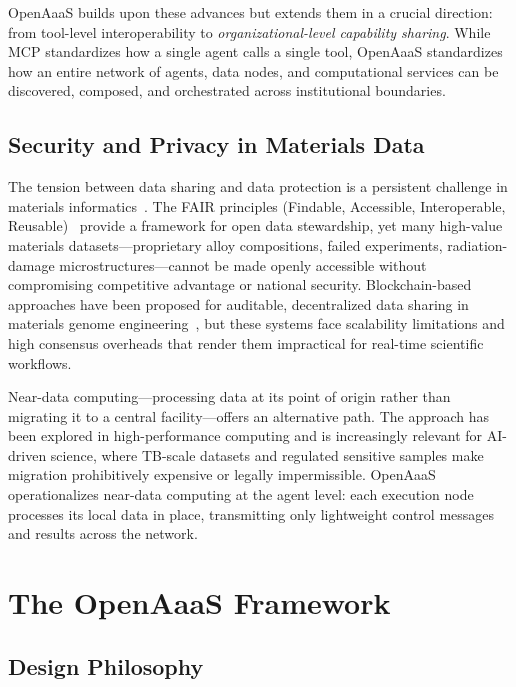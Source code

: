 \documentclass{article}
\begin{document}
OpenAaaS builds upon these advances but extends them in a crucial direction: from tool-level interoperability to \textit{organizational-level capability sharing}. While MCP standardizes how a single agent calls a single tool, OpenAaaS standardizes how an entire network of agents, data nodes, and computational services can be discovered, composed, and orchestrated across institutional boundaries.

\subsection{Security and Privacy in Materials Data}

The tension between data sharing and data protection is a persistent challenge in materials informatics~\cite{wilkinson2016,sears2024}. The FAIR principles (Findable, Accessible, Interoperable, Reusable)~\cite{wilkinson2016} provide a framework for open data stewardship, yet many high-value materials datasets---proprietary alloy compositions, failed experiments, radiation-damage microstructures---cannot be made openly accessible without compromising competitive advantage or national security. Blockchain-based approaches have been proposed for auditable, decentralized data sharing in materials genome engineering~\cite{blockchain2024}, but these systems face scalability limitations and high consensus overheads that render them impractical for real-time scientific workflows.

Near-data computing---processing data at its point of origin rather than migrating it to a central facility---offers an alternative path. The approach has been explored in high-performance computing and is increasingly relevant for AI-driven science, where TB-scale datasets and regulated sensitive samples make migration prohibitively expensive or legally impermissible. OpenAaaS operationalizes near-data computing at the agent level: each execution node processes its local data in place, transmitting only lightweight control messages and results across the network.

\section{The OpenAaaS Framework}
\label{sec:architecture}

\subsection{Design Philosophy}
\end{document}
